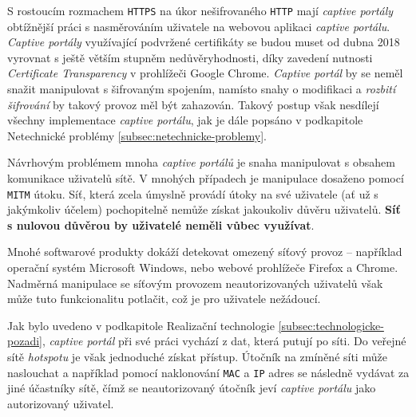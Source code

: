 \documentclass[thesis=M,czech]{FITthesis}[2012/10/20]
\begin{document}
S rostoucím rozmachem \texttt{HTTPS} na úkor nešifrovaného \texttt{HTTP} mají \textit{captive portály} obtížnější práci s nasměrováním uživatele na webovou aplikaci \textit{captive portálu}. \textit{Captive portály} využívající podvržené certifikáty se budou muset od dubna 2018 vyrovnat s ještě větším stupněm nedůvěryhodnosti, díky zavedení nutnosti \textit{Certificate Transparency} v prohlížeči Google Chrome\cite{google-mandatory-cert-transp}. \textit{Captive portál} by se neměl snažit manipulovat s šifrovaným spojením, namísto snahy o modifikaci a \textit{rozbití šifrování} by takový provoz měl být zahazován. Takový postup však nesdílejí všechny implementace \textit{captive portálu}, jak je dále popsáno v podkapitole Netechnické problémy \ref{subsec:netechnicke-problemy}.

Návrhovým problémem mnoha \textit{captive portálů} je snaha manipulovat s obsahem komunikace uživatelů sítě. V mnohých případech je manipulace dosaženo pomocí \texttt{MITM} útoku. Síť, která zcela úmyslně provádí útoky na své uživatele (ať už s jakýmkoliv účelem) pochopitelně nemůže získat jakoukoliv důvěru uživatelů. \textbf{Síť s nulovou důvěrou by uživatelé neměli vůbec využívat}.


Mnohé softwarové produkty dokáží detekovat omezený síťový provoz -- například operační systém Microsoft Windows, nebo webové prohlížeče Firefox a Chrome. Nadměrná manipulace se síťovým provozem neautorizovaných uživatelů však může tuto funkcionalitu potlačit, což je pro uživatele nežádoucí.




Jak bylo uvedeno v podkapitole Realizační technologie \ref{subsec:technologicke-pozadi}, \textit{captive portál} při své práci vychází z dat, která putují po síti. Do veřejné sítě \textit{hotspotu} je však jednoduché získat přístup. Útočník na zmíněné síti může naslouchat a například pomocí naklonování \texttt{MAC} a \texttt{IP} adres se následně vydávat za jiné účastníky sítě, čímž se neautorizovaný útočník jeví \textit{captive portálu} jako autorizovaný uživatel.

\end{document}
